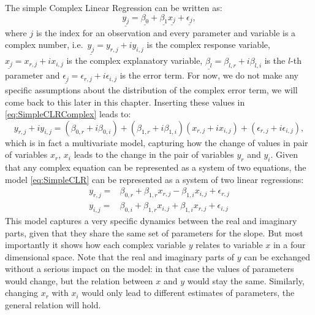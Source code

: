 \documentclass[
]{book}
\begin{document}
The simple Complex Linear Regression can be written as:
\begin{equation}
    \underline{y_j} = \underline{\beta_0} + \underline{\beta_1} \underline{x_j} + \underline{\epsilon_j},
    \label{eq:SimpleCLRComplex}
\end{equation}
where \(j\) is the index for an observation and every parameter and variable is a complex number, i.e.~\(\underline{y_j} = y_{r,j}+i y_{i,j}\) is the complex response variable, \(\underline{x_j} = x_{r,j}+i x_{i,j}\) is the complex explanatory variable, \(\underline{\beta_{l}} = \beta_{l,r} + i \beta_{l,i}\) is the \(l\)-th parameter and \(\underline{\epsilon_j} = \epsilon_{r,j} + i \epsilon_{i,j}\) is the error term. For now, we do not make any specific assumptions about the distribution of the complex error term, we will come back to this later in this chapter. Inserting these values in \eqref{eq:SimpleCLRComplex} leads to:
\begin{equation}
    y_{r,j}+i y_{i,j} = (\beta_{0,r} + i \beta_{0,i}) + (\beta_{1,r} + i \beta_{1,i}) (x_{r,j}+i x_{i,j}) + (\epsilon_{r,j} + i \epsilon_{i,j}),
    \label{eq:SimpleCLR}
\end{equation}
which is in fact a multivariate model, capturing how the change of values in pair of variables \(x_r\), \(x_i\) leads to the change in the pair of variables \(y_r\) and \(y_i\). Given that any complex equation can be represented as a system of two equations, the model \eqref{eq:SimpleCLR} can be represented as a system of two linear regressions:
\begin{equation}
    \begin{aligned}
        y_{r,j} = & \beta_{0,r} + \beta_{1,r} x_{r,j} - \beta_{1,i} x_{i,j} + \epsilon_{r,j} \\
        y_{i,j} = & \beta_{0,i} + \beta_{1,r} x_{i,j} + \beta_{1,i} x_{r,j} + \epsilon_{i,j}
    \end{aligned}
    \label{eq:SimpleCLRSystem}
\end{equation}
This model captures a very specific dynamics between the real and imaginary parts, given that they share the same set of parameters for the slope. But most importantly it shows how each complex variable \(y\) relates to variable \(x\) in a four dimensional space. Note that the real and imaginary parts of \(y\) can be exchanged without a serious impact on the model: in that case the values of parameters would change, but the relation between \(x\) and \(y\) would stay the same. Similarly, changing \(x_r\) with \(x_i\) would only lead to different estimates of parameters, the general relation will hold.
\end{document}
